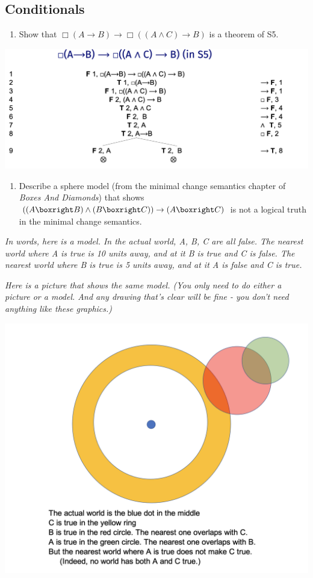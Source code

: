 \documentclass[
  11pt,
]{article}
\providecommand{\tightlist}{%
  \setlength{\itemsep}{0pt}\setlength{\parskip}{0pt}}
\begin{document}
\hypertarget{conditionals}{%
\subsection{Conditionals}\label{conditionals}}

\begin{enumerate}
\def\labelenumi{\arabic{enumi}.}
\setcounter{enumi}{16}
\tightlist
\item
  Show that
  \(\Box (A \rightarrow B) \rightarrow \Box ((A \wedge C) \rightarrow B)\)
  is a theorem of S5.
\end{enumerate}

\includegraphics{q17.png}

\newpage

\begin{enumerate}
\def\labelenumi{\arabic{enumi}.}
\setcounter{enumi}{17}
\tightlist
\item
  Describe a sphere model (from the minimal change semantics chapter of
  \emph{Boxes And Diamonds}) that shows
  \(((A \boxright B) \wedge (B \boxright C)) \rightarrow (A \boxright C)\)
  is not a logical truth in the minimal change semantics.
\end{enumerate}

\emph{In words, here is a model. In the actual world, A, B, C are all
false. The nearest world where A is true is 10 units away, and at it B
is true and C is false. The nearest world where B is true is 5 units
away, and at it A is false and C is true.}

\emph{Here is a picture that shows the same model. (You only need to do
either a picture or a model. And any drawing that's clear will be fine -
you don't need anything like these graphics.)}

\includegraphics{q18.png}
\end{document}

